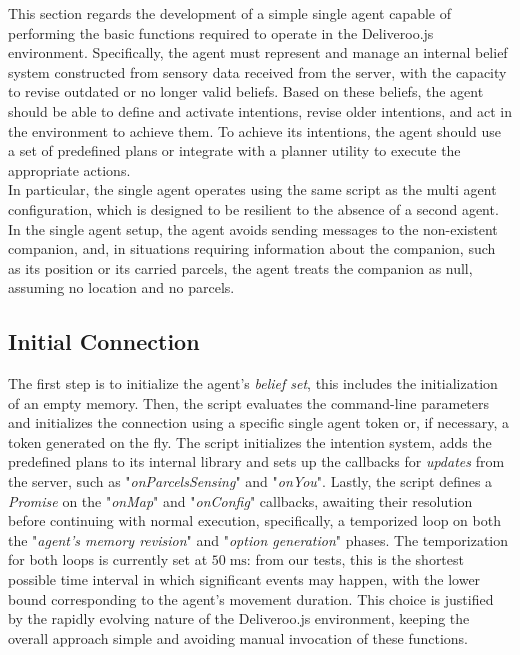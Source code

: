     This section regards the development of a simple single agent capable of performing the basic functions required to operate in the Deliveroo.js environment. Specifically, the agent must represent and manage an internal belief system constructed from sensory data received from the server, with the capacity to revise outdated or no longer valid beliefs. Based on these beliefs, the agent should be able to define and activate intentions, revise older intentions, and act in the environment to achieve them. To achieve its intentions, the agent should use a set of predefined plans or integrate with a planner utility to execute the appropriate actions.
    \medskip\\    
    In particular, the single agent operates using the same script as the multi agent configuration, which is designed to be resilient to the absence of a second agent. In the single agent setup, the agent avoids sending messages to the non-existent companion, and, in situations requiring information about the companion, such as its position or its carried parcels, the agent treats the companion as null, assuming no location and no parcels.

    \subsection{Initial Connection}
        The first step is to initialize the agent's \textit{belief set}, this includes the initialization of an empty memory. Then, the script evaluates the command-line parameters and initializes the connection using a specific single agent token or, if necessary, a token generated on the fly. The script initializes the intention system, adds the predefined plans to its internal library and sets up the callbacks for \textit{updates} from the server, such as "\textit{onParcelsSensing}" and "\textit{onYou}". Lastly, the script defines a \textit{Promise} on the "\textit{onMap}" and "\textit{onConfig}" callbacks, awaiting their resolution before continuing with normal execution, specifically, a temporized loop on both the "\textit{agent's memory revision}" and "\textit{option generation}" phases. The temporization for both loops is currently set at $50\;\text{ms}$: from our tests, this is the shortest possible time interval in which significant events may happen, with the lower bound corresponding to the agent's movement duration. This choice is justified by the rapidly evolving nature of the Deliveroo.js environment, keeping the overall approach simple and avoiding manual invocation of these functions.

